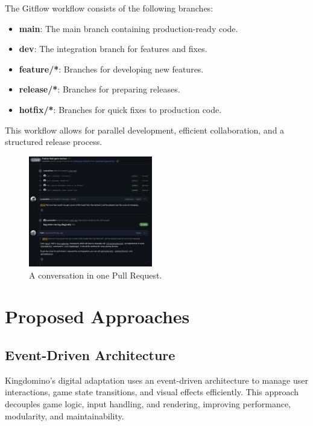 \documentclass[conference]{IEEEtran}
\begin{document}
The Gitflow workflow consists of the following branches:
\begin{itemize}
    \item \textbf{main}: The main branch containing production-ready code.
    \item \textbf{dev}: The integration branch for features and fixes.
    \item \textbf{feature/*}: Branches for developing new features.
    \item \textbf{release/*}: Branches for preparing releases.
    \item \textbf{hotfix/*}: Branches for quick fixes to production code.
\end{itemize}

This workflow allows for parallel development, efficient collaboration, and a
structured release process.

\begin{figure}[htbp]
    \centerline{\includegraphics[width=0.48\textwidth]{assets/github-pr.png}}
    \caption{A conversation in one Pull Request.}\label{fig:github-pr}
\end{figure}

\section{Proposed Approaches}
\label{sec:proposed_approaches}

\subsection{Event-Driven Architecture}

Kingdomino’s digital adaptation uses an event-driven architecture to manage
user interactions, game state transitions, and visual effects efficiently. This
approach decouples game logic, input handling, and rendering, improving
performance, modularity, and maintainability.
\end{document}
